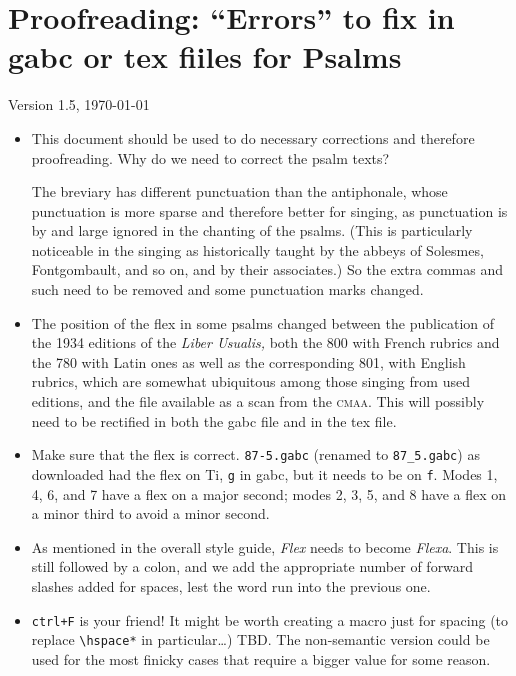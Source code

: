 \documentclass[11pt]{article}
\begin{document}
 \section{Proofreading: ``Errors'' to fix in gabc or tex fiiles for Psalms}
 
 {\centering Version 1.5, \today\par}
 
\begin{itemize}
 \item
 This document should be used to do necessary corrections and therefore proofreading. Why do we need to correct the psalm texts?
 
The breviary has different punctuation than the antiphonale, whose punctuation is more sparse and therefore better for singing, as punctuation is by and large ignored in the chanting of the psalms. (This is particularly noticeable in the singing as historically taught by the abbeys of Solesmes, Fontgombault, and so on, and by their associates.) So the extra commas and such need to be removed and some punctuation marks changed.
 
 \item
 The position of the flex in some psalms changed between the publication of the 1934 editions of the \textit{Liber Usualis,} both the 800 with French rubrics and the 780 with Latin ones as well as the corresponding 801, with English rubrics, which are somewhat ubiquitous among those singing from used editions, and the file available as a scan from the \textsc{cmaa}. This will possibly need to be rectified in both the gabc file and in the tex file.
 
 \item
 
 Make sure that the flex is correct. \verb|87-5.gabc| (renamed to \verb|87_5.gabc|) as downloaded had the flex on Ti, \verb|g| in gabc, but it needs to be on \verb|f|. Modes 1, 4, 6, and 7 have a flex on a major second; modes 2, 3, 5, and 8 have a flex on a minor third to avoid a minor second.

 \item
 As mentioned in the overall style guide, \textit{Flex} needs to become \textit{Flexa}. This is still followed by a colon, and we add the appropriate number of forward slashes added for spaces, lest the word run into the previous one. 

 \item
\texttt{ctrl+F} is your friend! It might be worth creating a macro just for spacing (to replace \verb|\hspace*| in particular…) TBD. The non-semantic version could be used for the most finicky cases that require a bigger value for some reason.


\end{itemize}
\end{document}
